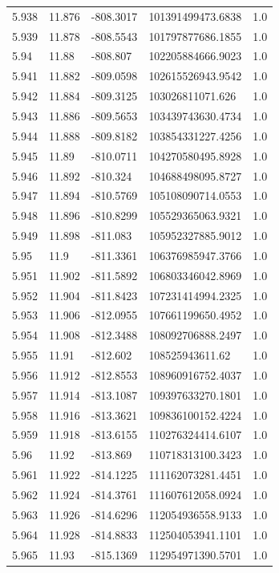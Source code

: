\begin{tabular}{lllll}
5.938 & 11.876 & -808.3017 & 101391499473.6838 & 1.0 \\
5.939 & 11.878 & -808.5543 & 101797877686.1855 & 1.0 \\
5.94 & 11.88 & -808.807 & 102205884666.9023 & 1.0 \\
5.941 & 11.882 & -809.0598 & 102615526943.9542 & 1.0 \\
5.942 & 11.884 & -809.3125 & 103026811071.626 & 1.0 \\
5.943 & 11.886 & -809.5653 & 103439743630.4734 & 1.0 \\
5.944 & 11.888 & -809.8182 & 103854331227.4256 & 1.0 \\
5.945 & 11.89 & -810.0711 & 104270580495.8928 & 1.0 \\
5.946 & 11.892 & -810.324 & 104688498095.8727 & 1.0 \\
5.947 & 11.894 & -810.5769 & 105108090714.0553 & 1.0 \\
5.948 & 11.896 & -810.8299 & 105529365063.9321 & 1.0 \\
5.949 & 11.898 & -811.083 & 105952327885.9012 & 1.0 \\
5.95 & 11.9 & -811.3361 & 106376985947.3766 & 1.0 \\
5.951 & 11.902 & -811.5892 & 106803346042.8969 & 1.0 \\
5.952 & 11.904 & -811.8423 & 107231414994.2325 & 1.0 \\
5.953 & 11.906 & -812.0955 & 107661199650.4952 & 1.0 \\
5.954 & 11.908 & -812.3488 & 108092706888.2497 & 1.0 \\
5.955 & 11.91 & -812.602 & 108525943611.62 & 1.0 \\
5.956 & 11.912 & -812.8553 & 108960916752.4037 & 1.0 \\
5.957 & 11.914 & -813.1087 & 109397633270.1801 & 1.0 \\
5.958 & 11.916 & -813.3621 & 109836100152.4224 & 1.0 \\
5.959 & 11.918 & -813.6155 & 110276324414.6107 & 1.0 \\
5.96 & 11.92 & -813.869 & 110718313100.3423 & 1.0 \\
5.961 & 11.922 & -814.1225 & 111162073281.4451 & 1.0 \\
5.962 & 11.924 & -814.3761 & 111607612058.0924 & 1.0 \\
5.963 & 11.926 & -814.6296 & 112054936558.9133 & 1.0 \\
5.964 & 11.928 & -814.8833 & 112504053941.1101 & 1.0 \\
5.965 & 11.93 & -815.1369 & 112954971390.5701 & 1.0 \\

\end{tabular}
